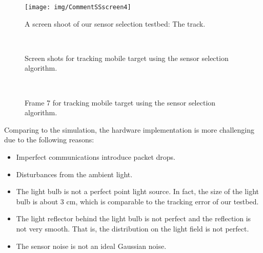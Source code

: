 \begin{figure}
  \centering
  \texttt{[image: img/CommentSSscreen4]}
  \caption{A screen shoot of our sensor selection testbed: The track.}\label{f:ScreenShots4}
\end{figure}


\begin{figure}
  \begin{center}
    \mbox{
       \quad
      }
    \mbox{
       \quad
      }
    \mbox{
       \quad
      }
    \caption{Screen shots for tracking mobile target using the sensor selection algorithm.}
    \label{f:Screen1}
  \end{center}
\end{figure}

\begin{figure}
    \begin{center}
    \mbox{
       \quad
      }
    \caption{Frame 7 for tracking mobile target using the sensor selection algorithm.}
    \label{f:Screen2}
  \end{center}
\end{figure}


Comparing to the simulation, the hardware implementation is more challenging due to the following reasons:
\begin{itemize}
  \item Imperfect communications introduce packet drops.
  \item Disturbances from the ambient light.
  \item The light bulb is not a perfect point light source. In fact, the size of the light bulb is about 3 cm, which is comparable to the tracking error of our testbed.
  \item The light reflector behind the light bulb is not perfect and the reflection is not very smooth. That is, the distribution on the light field is not perfect.
  \item The sensor noise is not an ideal Gaussian noise.
\end{itemize}


